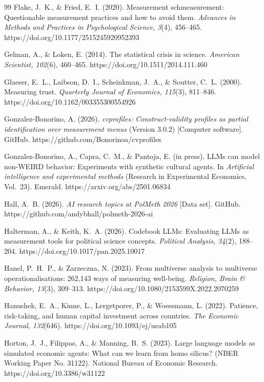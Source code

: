 \documentclass[10pt,letterpaper]{article}
\begin{document}
\begin{thebibliography}{99}
 Flake, J.~K., \& Fried, E.~I. (2020). Measurement schmeasurement: Questionable measurement practices and how to avoid them. \textit{Advances in Methods and Practices in Psychological Science, 3}(4), 456--465. https://doi.org/10.1177/2515245920952393

 Gelman, A., \& Loken, E. (2014). The statistical crisis in science. \textit{American Scientist, 102}(6), 460--465. https://doi.org/10.1511/2014.111.460

 Glaeser, E.~L., Laibson, D.~I., Scheinkman, J.~A., \& Soutter, C.~L. (2000). Measuring trust. \textit{Quarterly Journal of Economics, 115}(3), 811--846. https://doi.org/10.1162/003355300554926

 Gonzalez-Bonorino, A. (2026). \textit{cvprofiles: Construct-validity profiles as partial identification over measurement menus} (Version 3.0.2) [Computer software]. GitHub. https://github.com/Bonorinoa/cvprofiles

 Gonzalez-Bonorino, A., Capra, C.~M., \& Pantoja, E. (in press). LLMs can model non-WEIRD behavior: Experiments with synthetic cultural agents. In \textit{Artificial intelligence and experimental methods} (Research in Experimental Economics, Vol.~23). Emerald. https://arxiv.org/abs/2501.06834

 Hall, A.~B. (2026). \textit{AI research topics at PolMeth 2026} [Data set]. GitHub. https://github.com/andybhall/polmeth-2026-ai

 Halterman, A., \& Keith, K.~A. (2026). Codebook LLMs: Evaluating LLMs as measurement tools for political science concepts. \textit{Political Analysis, 34}(2), 188--204. https://doi.org/10.1017/pan.2025.10017

 Hanel, P.~H.~P., \& Zarzeczna, N. (2023). From multiverse analysis to multiverse operationalisations: 262,143 ways of measuring well-being. \textit{Religion, Brain \& Behavior, 13}(3), 309--313. https://doi.org/10.1080/2153599X.2022.2070259

 Hanushek, E.~A., Kinne, L., Lergetporer, P., \& Woessmann, L. (2022). Patience, risk-taking, and human capital investment across countries. \textit{The Economic Journal, 132}(646). https://doi.org/10.1093/ej/ueab105

 Horton, J.~J., Filippas, A., \& Manning, B.~S. (2023). Large language models as simulated economic agents: What can we learn from homo silicus? (NBER Working Paper No. 31122). National Bureau of Economic Research. https://doi.org/10.3386/w31122


\end{thebibliography}
\end{document}
